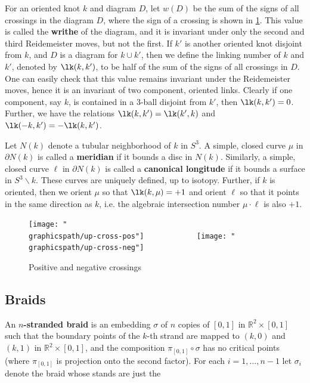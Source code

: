 For an oriented knot $k$ and diagram $D$, let $w(D)$ be the sum of the signs of all crossings in the diagram $D$, where the sign of a crossing is shown in \cref{positive-negative-crossings}. This value is called the \textbf{writhe} of the diagram, and it is invariant under only the second and third Reidemeister moves, but not the first. If $k'$ is another oriented knot disjoint from $k$, and $D$ is a diagram for $k \cup k'$, then we define the linking number of $k$ and $k'$, denoted by $\lk(k,k')$, to be half of the sum of the signs of all crossings in $D$. One can easily check that this value remains invariant under the Reidemeister moves, hence it is an invariant of two component, oriented links. Clearly if one component, say $k$, is contained in a 3-ball disjoint from $k'$, then $\lk(k,k')=0$. Further, we have the relations $\lk(k,k')=\lk(k',k)$ and $\lk(-k,k')=-\lk(k,k')$.

Let $N(k)$ denote a tubular neighborhood of $k$ in $S^3$. A simple, closed curve $\mu$ in $\partial N(k)$ is called a \textbf{meridian} if it bounds a disc in $N(k)$. Similarly, a simple, closed curve $\ell$ in $\partial N(k)$ is called a \textbf{canonical longitude} if it bounds a surface in $S^3 \backslash k$. These curves are uniquely defined, up to isotopy. Further, if $k$ is oriented, then we orient $\mu$ so that $\lk(k,\mu)=+1$ and orient $\ell$ so that it points in the same direction as $k$, i.e. the algebraic intersection number $\mu \cdot \ell$ is also $+1$.

\begin{figure}
\centering
\texttt{[image: "\\graphicspath/up-cross-pos"]} \ \ \ \ \ \ \ \ \ \ \ \ \texttt{[image: "\\graphicspath/up-cross-neg"]}
\caption{Positive and negative crossings}
\label{positive-negative-crossings}
\end{figure}




\subsection{Braids}
\label{Braids}


An \textbf{$n$-stranded braid} is an embedding $\sigma$ of $n$ copies of $[0,1]$ in $\mathbb R^2 \times [0,1]$ such that the boundary points of the $k$-th strand are mapped to $(k,0)$ and $(k,1)$ in $\mathbb R^2 \times [0,1]$, and the composition $\pi_{[0,1]} \circ \sigma$ has no critical points (where $\pi_{[0,1]}$ is projection onto the second factor). For each $i=1,\ldots,n-1$ let $\sigma_i$ denote the braid whose stands are just the 



